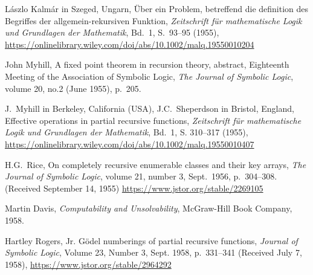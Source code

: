 \documentclass[12pt]{article}
\theoremstyle{remark}
\newcommand{\bibquote}[1]{}
\newcommand{\nb}[1]{{\color{red}}}
\begin{document}
\begin{thebibliography}{99}

L\'aszlo Kalm\'ar in Szeged, Ungarn, \"Uber ein Problem, betreffend die definition des Begriffes der allgemein-rekursiven Funktion, \emph{Zeitschrift f\"ur mathematische Logik und Grundlagen der Mathematik}, Bd.~1, S.~93--95 (1955), \url{https://onlinelibrary.wiley.com/doi/abs/10.1002/malq.19550010204}

John Myhill, A fixed point theorem in recursion theory, abstract,  Eighteenth Meeting of the Association of Symbolic Logic, \emph{The Journal of Symbolic Logic}, volume 20, no.2  (June 1955), p.~205.
\bibquote{\nb{``Rice conjectured that co
nversely every c.r.e. class can be written in the form $\Sigma T(\alpha_i)$. We can use the fixed-point theorem to prove this conjecture (which was proved also in another way by MacNaughton and Shapiro).'' (\rus{Доказательство не приводится})}}


J.~Myhill in Berkeley,  California (USA), J.C.~Sheperdson in Bristol, England,
Effective operations in partial recursive functions, \emph{Zeitschrift f\"ur mathematische Logik und Grundlagen der Mathematik}, Bd.~1, S. 310--317 (1955),
\url{https://onlinelibrary.wiley.com/doi/abs/10.1002/malq.19550010407}

H.G.~Rice, On completely recursive enumerable classes and their key arrays,
\emph{The Journal of Symbolic Logic}, volume 21, number 3, Sept.~1956, p.~304--308. (Received September 14, 1955) \url{https://www.jstor.org/stable/2269105}

\bibquote{\rus{\nb{Доказывается, что любой c.r.e. class задаётся key array (среди прочего) --- этот результат, пишет автор, получили McNaughton (не опубликовано), Myhill (ссылка на \cite{Myhill1955}) и Norman Shapiro (без ссылки)}}}

\nb{\rus{проверить, в чём разница между ссылками на МакНотона и Шапиро!}}

Martin Davis, \emph{Computability and Unsolvability}, McGraw-Hill Book Company, 1958.

Hartley Rogers, Jr. G\"odel numberings of partial recursive functions, \emph{Journal of Symbolic Logic}, Volume 23, Number 3, Sept. 1958, p.~331--341 (Received July 7, 1958),  \url{https://www.jstor.org/stable/2964292}

\bibquote{\nb{%
``Intuitively, a G\"odel numbering is an association of numbers with partial recursive functions such that the following three condition hold:

}}
\end{thebibliography}
\end{document}
